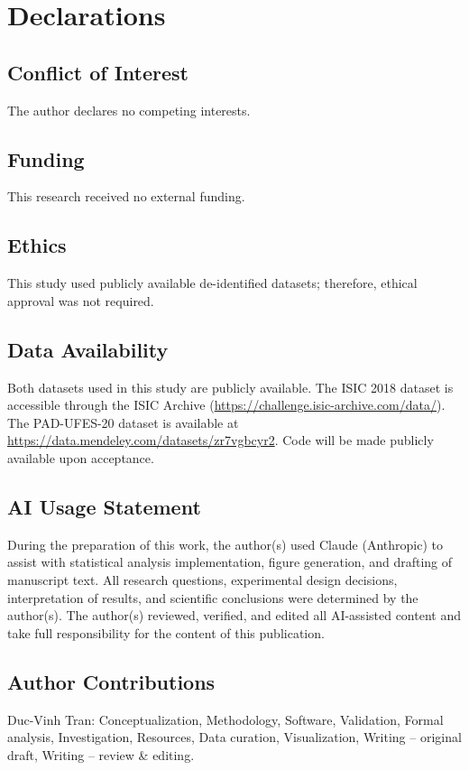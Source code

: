 \documentclass{article}
\begin{document}
\section*{Declarations}

\subsection*{Conflict of Interest}

The author declares no competing interests.

\subsection*{Funding}

This research received no external funding.

\subsection*{Ethics}

This study used publicly available de-identified datasets; therefore, ethical approval was not required.

\subsection*{Data Availability}

Both datasets used in this study are publicly available. The ISIC 2018 dataset is accessible through the ISIC Archive (\url{https://challenge.isic-archive.com/data/}). The PAD-UFES-20 dataset is available at \url{https://data.mendeley.com/datasets/zr7vgbcyr2}. Code will be made publicly available upon acceptance.

\subsection*{AI Usage Statement}

During the preparation of this work, the author(s) used Claude (Anthropic) to assist with statistical analysis implementation, figure generation, and drafting of manuscript text. All research questions, experimental design decisions, interpretation of results, and scientific conclusions were determined by the author(s). The author(s) reviewed, verified, and edited all AI-assisted content and take full responsibility for the content of this publication.

\subsection*{Author Contributions}

Duc-Vinh Tran: Conceptualization, Methodology, Software, Validation, Formal analysis, Investigation, Resources, Data curation, Visualization, Writing -- original draft, Writing -- review \& editing.
\end{document}
